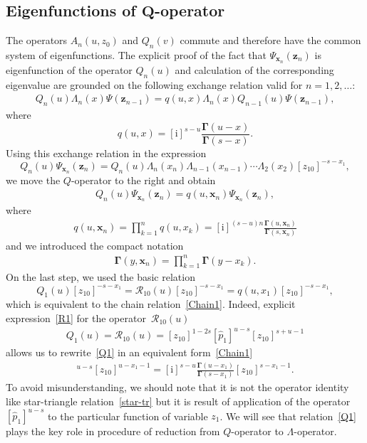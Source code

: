 \documentclass[pdftex]{sigma}
\renewcommand{\imath}{\mathrm{i}}
\numberwithin{equation}{section}
\begin{document}
\subsection[Eigenfunctions of Q-operator]{Eigenfunctions of $\boldsymbol{Q}$-operator}

The operators $A_n(u,z_0)$ and $Q_n(v)$ commute and
therefore have the common system of eigenfunctions.
The explicit proof of the fact that
$\Psi_{\bm x_n}(\bm z_n)$ is eigenfunction
of the operator $Q_n(u)$ and calculation of the corresponding eigenvalue
are grounded on the following exchange relation valid for $n=1 ,2 ,\dots$:
\begin{align}
\label{exchQA}
Q_n(u) \Lambda_n(x) \Psi(\bm z_{n-1})
= q(u ,x) \Lambda_n(x) Q_{n-1}(u) \Psi(\bm z_{n-1}) ,
\end{align}
where
\begin{equation*}
	q(u ,x) = [\imath]^{s-u} \frac{\mathbf{\Gamma}(u-x)}{\mathbf{\Gamma}(s-x)} .
\end{equation*}
Using this exchange relation in the expression
\begin{equation*}
	Q_n(u) \Psi_{\bm x_n}(\bm z_n) =
	Q_n(u) \Lambda_n(x_n)
	\Lambda_{n-1}(x_{n-1})\cdots
	\Lambda_{2}(x_{2}) [z_{10}]^{-s-x_1},
\end{equation*}
we move the $Q$-operator to the right and obtain
\begin{align}
	\label{QPsi}
	Q_n(u) \Psi_{\bm x_n}(\bm z_n)
	= q(u ,\bm x_{n})
	 \Psi_{\bm x_n}(\bm z_n) ,
\end{align}
where
\begin{align}\label{qn}
q(u ,\bm x_{n}) = \prod_{k=1}^n q(u ,x_{k}) =
[\imath]^{(s-u)n}
\frac{\mathbf{\Gamma}(u ,\bm{x}_n)}{\mathbf{\Gamma}(s ,\bm{x}_n)}
\end{align}
and we introduced the compact notation
\begin{align*}
\mathbf{\Gamma}(y ,\bm{x}_n) = \prod_{k=1}^n \mathbf{\Gamma}(y-x_k) .
\end{align*}
On the last step, we used the basic relation
\begin{equation}\label{Q1}
	Q_1(u) [z_{10}]^{-s-x_1} =
\mathcal{R}_{10}(u) [z_{10}]^{-s-x_1}
	= q(u,x_1) [z_{10}]^{-s-x_1} ,
\end{equation}
which is equivalent to the chain relation~\eqref{Chain1}.
Indeed, explicit expression~\eqref{R1} for the
operator~$\mathcal{R}_{10}(u)$
\begin{align*}
Q_1( u) = \mathcal{R}_{10}(u) = [z_{10}]^{1-2s}
[\hat{p}_1]^{u-s} [z_{10}]^{s+u-1}
\end{align*}
allows us to rewrite~\eqref{Q1} in an equivalent form~\eqref{Chain1}
\begin{align*}
[\hat{p}_1]^{u-s} [z_{10}]^{u-x_1-1} = [\imath]^{s-u} \frac{\mathbf{\Gamma}(u-x_1)}{\mathbf{\Gamma}(s-x_1)}
 [z_{10}]^{s-x_1-1} .
\end{align*}
To avoid misunderstanding, we should note that
it is not the operator identity like star-triangle relation~\eqref{star-tr} but it is result of application of the operator
$[\hat{p}_1]^{u-s}$ to the particular function of variable $z_1$.
We will see that relation~\eqref{Q1} plays the key role in
procedure of reduction from $Q$-operator to $\Lambda$-operator.
\end{document}
